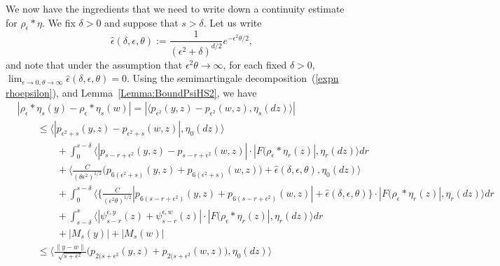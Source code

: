 \documentclass[12pt]{article}
\numberwithin{equation}{section}
\begin{document}
We now have the ingredients that we need to write down a continuity 
estimate for $\rho_\epsilon*\eta$.
We fix $\delta>0$ and 
suppose that $s>\delta$.
Let us write
\[
\widehat{\epsilon}(\delta,\epsilon,\theta):=
\frac{1}{(\epsilon^2+\delta)^{d/2}}
e^{-\epsilon^2\theta/2}, %
\]
and note that under the assumption that $\epsilon^2\theta\to \infty$, for 
each fixed $\delta>0$,  
$\lim_{\epsilon\to 0, \theta\to\infty}
\widehat{\epsilon}(\delta,\epsilon,\theta)=0$. 
Using the semimartingale decomposition~(\ref{expn rhoepsilon}),
and Lemma~\ref{Lemma:BoundPsiHS2},
we have
\begin{align}
& |\rho_\epsilon*\eta_s(y)-\rho_\epsilon*\eta_s(w)| \nonumber 
= |\langle p_{\epsilon^2}(y,z)-p_{\epsilon^2}(w,z),\eta_s(dz) \rangle | 
\nonumber
\\ 
&\qquad
    \leq 
\big\langle |p_{\epsilon^2+s}(y,z)-p_{\epsilon^2+s}(w,z)|, 
\eta_0(dz)\big\rangle 
\nonumber
	\\ &\qquad \qquad {}
    +
\int_0^{s-\delta}
\big\langle |p_{s-r+\epsilon^2}(y,z)-p_{s-r+\epsilon^2}(w,z)| 
\cdot |F(\rho_\epsilon*\eta_r(z)|, 
\eta_r(dz) \big\rangle  dr
\nonumber
    \\ &\qquad \qquad {}
	+ \big\langle\frac{C}{(\theta\epsilon^2)^{1/2}} \Big(%
	p_{6(\epsilon^2+s)}(y,z)+p_{6(\epsilon^2+s)}(w,z)\Big) %
	+\widehat{\epsilon}(\delta,\epsilon,\theta) %
	,\eta_0(dz)\rangle
	\nonumber
    \\ &\qquad \qquad {}
    +
\int_0^{s-\delta}
\big\langle \Big\{
\frac{C}{(\epsilon^2\theta)^{1/2}}
|p_{6(s-r+\epsilon^2)}(y,z)+
p_{6(s-r+\epsilon^2)}(w,z)| +\widehat{\epsilon}(\delta,\epsilon,\theta)\Big\}
\cdot |F(\rho_\epsilon*\eta_r(z)|, 
\eta_r(dz) \big\rangle  dr
\nonumber
    \\ &\qquad \qquad {}
+ \int_{s-\delta}^s \big\langle 
|\psi_{s-r}^{\epsilon,y}(z) + \psi_{s-r}^{\epsilon, w}(z) |
\cdot |F(\rho_\epsilon*\eta_r(z)|, 
\eta_r(dz) \big\rangle  dr
\nonumber
\\ & \qquad \qquad {}
+ |M_s(y)|+|M_s(w)| 
\nonumber
\\ & \qquad 
\leq \Big\langle \frac{\|y-w\|}{\sqrt{s+\epsilon^2}}
\big(p_{2(s+\epsilon^2}(y,z)+p_{2(s+\epsilon^2}(w,z)\big),\eta_0(dz)\Big\rangle

\end{align}
\end{document}
